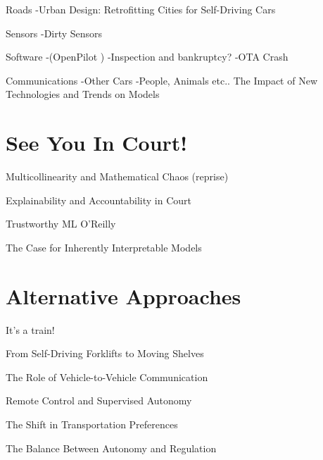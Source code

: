 Roads
-Urban Design: Retrofitting Cities for Self-Driving Cars

Sensors
-Dirty Sensors 

Software 
-(OpenPilot \cite{openpilot})
-Inspection and bankruptcy?
-OTA Crash \cite{otacrash}

Communications
-Other Cars
-People, Animals etc.. The Impact of New Technologies and Trends on Models


\section{See You In Court!}

Multicollinearity and Mathematical Chaos (reprise)

Explainability and Accountability in Court

Trustworthy ML O'Reilly \cite{trustworthyml}

The Case for Inherently Interpretable Models

\section{Alternative Approaches}

It's a train!

From Self-Driving Forklifts to Moving Shelves

The Role of Vehicle-to-Vehicle Communication

Remote Control and Supervised Autonomy

The Shift in Transportation Preferences

The Balance Between Autonomy and Regulation
